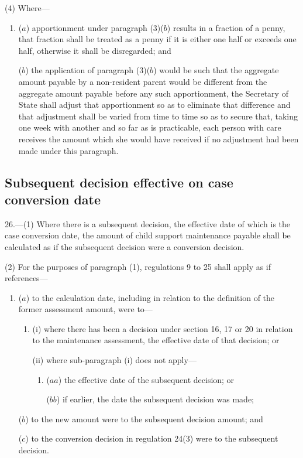 \documentclass[12pt,a4paper]{article}
\begin{document}
(4) Where—
\begin{enumerate}\item[]
($a$) apportionment under paragraph (3)($b$)  results in a fraction of a penny, that fraction shall be treated as a penny if it is either one half or exceeds one half, otherwise it shall be disregarded; and

($b$) the application of paragraph (3)($b$)  would be such that the aggregate amount payable by a non-resident parent would be different from the aggregate amount payable before any such apportionment, the Secretary of State shall adjust that apportionment so as to eliminate that difference and that adjustment shall be varied from time to time so as to secure that, taking one week with another and so far as is practicable, each person with care receives the amount which she would have received if no adjustment had been made under this paragraph.
\end{enumerate}


\subsection[26. Subsequent decision effective on case conversion date]{Subsequent decision effective on case conversion date}

26.---(1)  Where there is a subsequent decision, the effective date of which is the case conversion date, the amount of child support maintenance payable shall be calculated as if the subsequent decision were a conversion decision.

(2) For the purposes of paragraph (1), regulations 9 to 25 shall apply as if references—
\begin{enumerate}\item[]
($a$) to the calculation date, including in relation to the definition of the former assessment amount, were to—
\begin{enumerate}\item[]
(i) where there has been a decision under section 16, 17 or 20 in relation to the maintenance assessment, the effective date of that decision; or

(ii) where sub-paragraph (i)  does not apply—
\begin{enumerate}\item[]
($aa$) the effective date of the subsequent decision; or

($bb$) if earlier, the date the subsequent decision was made;
\end{enumerate}
\end{enumerate}

($b$) to the new amount were to the subsequent decision amount; and

($c$) to the conversion decision in regulation 24(3) were to the subsequent decision.
\end{enumerate}
\end{document}
